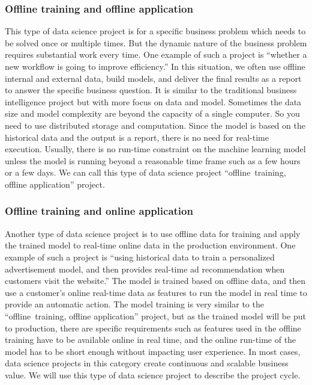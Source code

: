 \documentclass[12pt,]{krantz}
\begin{document}
\hypertarget{offline-training-and-offline-application}{%
\subsubsection{Offline training and offline application}\label{offline-training-and-offline-application}}

This type of data science project is for a specific business problem which needs to be solved once or multiple times. But the dynamic nature of the business problem requires substantial work every time. One example of such a project is ``whether a new workflow is going to improve efficiency.'' In this situation, we often use offline internal and external data, build models, and deliver the final results as a report to answer the specific business question. It is similar to the traditional business intelligence project but with more focus on data and model. Sometimes the data size and model complexity are beyond the capacity of a single computer. So you need to use distributed storage and computation. Since the model is based on the historical data and the output is a report, there is no need for real-time execution. Usually, there is no run-time constraint on the machine learning model unless the model is running beyond a reasonable time frame such as a few hours or a few days. We can call this type of data science project ``offline~training, offline application'' project.

\hypertarget{offline-training-and-online-application}{%
\subsubsection{Offline training and online application}\label{offline-training-and-online-application}}

Another type of data science project is to use offline data for training and apply the trained model to real-time online data in the production environment. One example of such a project is ``using historical data to train a personalized advertisement model, and then provides real-time ad recommendation when customers visit the website.'' The model is trained based on offline data, and then use a customer's online real-time data as features to run the model in real time to provide an automatic action. The model training is very similar to the ``offline~training, offline application'' project, but as the trained model will be put to production, there are specific requirements such as features used in the offline training have to be available online in real time, and the online run-time of the model has to be short enough without impacting user experience. In most cases, data science projects in this category create continuous and scalable business value. We will use this type of data science project to describe the project cycle.
\end{document}
